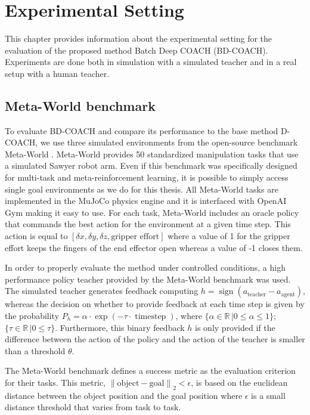 \chapter{Experimental Setting}
\label{chapter:Experimental Setting}

This chapter provides information about the experimental setting for the evaluation of the proposed method Batch Deep COACH (BD-COACH). Experiments are done both in simulation with a simulated teacher and in a real setup with a human teacher.


\section{Meta-World benchmark}
\label{section:Meta-World Benchmark}
To evaluate BD-COACH and compare its performance to the base method D-COACH, we use three simulated environments from the open-source benchmark Meta-World \cite{metaworld}. Meta-World 
provides 50 standardized manipulation tasks that use a simulated Sawyer robot arm. Even if this benchmark was specifically designed for multi-task and meta-reinforcement learning, it is possible to simply access single goal environments as we do for this thesis. All Meta-World tasks are implemented in the MuJoCo physics engine \cite{mujoco} and it is interfaced with OpenAI Gym \cite{openai} making it easy to use. 
For each task, Meta-World includes an oracle policy that commands the best action for the environment at a given time step. This action is equal to 
$[\delta x, \delta y, \delta z, \textrm{gripper effort}]$
where a value of 1 for the gripper effort keeps the fingers of the end effector open whereas a value of -1 closes them.



In order to properly evaluate the method under controlled conditions, a high performance policy teacher provided by the Meta-World benchmark was used. The simulated teacher generates feedback computing $h = \operatorname{sign}(a_\text{teacher} - a_\text{agent})$, whereas the decision on whether to provide feedback at each time step is given by the probability $P_h = \alpha \cdot \operatorname{exp}(-\tau \cdot \operatorname{time step})$, where $\{\alpha \in \mathbb{R}\, | 0 \leq \alpha \leq 1 \}$; $\{\tau \in \mathbb{R} \, | 0 \leq \tau\}$. Furthermore, this binary feedback $h$ is only provided if the difference between the action of the policy and the action of the teacher is smaller than a threshold $\theta$.

The Meta-World benchmark defines a success metric as the evaluation criterion for their tasks. This metric, ${\left\lVert \text{object}-\text{goal} \right\rVert}_2 < \epsilon$, is based on the euclidean distance between the object position and the goal position where $\epsilon$ is a small distance threshold that varies from task to task.




